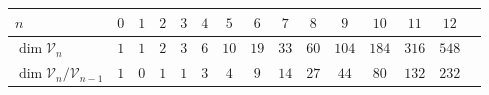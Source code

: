 {
\renewcommand*{\arraystretch}{1.4} %
\footnotesize
\begin{longtable}{lcccccccccccccc}
\hline
    $n$ & $0$ & $1$ & $2$ & $3$ & $4$ & $5$ & $6$ & $7$ & $8$ & $9$ & $10$ & $11$ & $12$ \\ \hline \endhead
    $\dim \mathcal V_n$ & $1$ & $1$ & $2$ & $3$ & $6$ & $10$ & $19$ & $33$ & $60$ & $104$ & $184$ & $316$ & $548$ \\
    $\dim \mathcal V_n / \mathcal V_{n-1}$ & $1$ & $0$ & $1$ & $1$ & $3$ & $4$ & $9$ & $14$ & $27$ & $44$ & $80$ & $132$ & $232$ \\
    \hline
\end{longtable}
\normalsize
}


